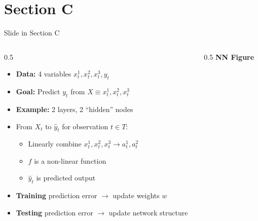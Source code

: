 \documentclass[aspectratio = 1610, english, 11pt, xcolor = dvipsnames]{beamer}
\begin{document}
  \section{Section C}
  \begin{frame}{Slide in Section C}
    \begin{columns}[T] %
      \begin{column}{0.5\textwidth}
        \begin{itemize}
          \item \textbf{Data:} 4 variables $x_{t}^{1}, x_{t}^{2}, x_{t}^{3}, y_{t}$
          \vspace{1mm}
          \item \textbf{Goal:} Predict $y_{t}$ from $X \equiv x_{t}^{1}, x_{t}^{2}, x_{t}^{3}$
          \vspace{1mm}
          \item \textbf{Example:} 2 layers, 2 ``hidden'' nodes
          \vspace{1mm}
          \item From $X_{t}$ to $\hat{y}_{t}$ for observation $t \in T$:
          \vspace{1mm}
          \begin{itemize}
            \item Linearly combine $x_{t}^{1}, x_{t}^{2}, x_{t}^{3} \to a_{t}^{1}, a_{t}^{2}$
            \vspace{1mm}
            \item $f$ is a non-linear function
            \vspace{1mm}
            \item $\hat{y}_t$ is predicted output
          \end{itemize}
          \vspace{1mm}
          \item \textbf{Training} prediction error $\to$ update weights $w$
          \vspace{1mm}
          \item \textbf{Testing} prediction error $\to$ update network structure
        \end{itemize}
      \end{column}  
      \begin{column}{0.5\textwidth}
        \centering
        \textbf{NN Figure}
\end{column}
\end{columns}
\end{frame}
\end{document}
